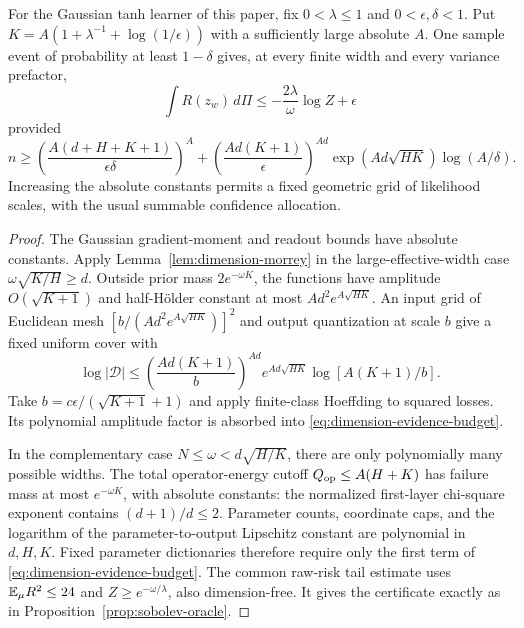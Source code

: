 \begin{proposition}
\label{prop:dimension-evidence}
For the Gaussian tanh learner of this paper, fix
$0<\lambda\le1$ and $0<\epsilon,\delta<1$. Put
$K=A(1+\lambda^{-1}+\log(1/\epsilon))$ with a sufficiently large
absolute $A$. One sample event of probability at least $1-\delta$
gives, at every finite width and every variance prefactor,
\[
 \int R(z_w)\,d\Pi\le-\frac{2\lambda}{\omega}\log Z+\epsilon
\]
provided
\begin{equation}
 n\ge\left(\frac{A(d+H+K+1)}{\epsilon\delta}\right)^A
  +\left(\frac{Ad(K+1)}\epsilon\right)^{Ad}
        \exp(A d\sqrt{HK})\log(A/\delta).
 \label{eq:dimension-evidence-budget}
\end{equation}
Increasing the absolute constants permits a fixed geometric grid of
likelihood scales, with the usual summable confidence allocation.
\end{proposition}
\begin{proof}
The Gaussian gradient-moment and readout bounds have absolute constants.
Apply Lemma~\ref{lem:dimension-morrey} in the large-effective-width
case $\omega\sqrt{K/H}\ge d$. Outside prior mass
$2e^{-\omega K}$, the functions have amplitude $O(\sqrt{K+1})$
and half-H\"older constant at most $Ad^2e^{A\sqrt{HK}}$.
An input grid of Euclidean mesh
$[b/(Ad^2e^{A\sqrt{HK}})]^2$ and output quantization at scale $b$
give a fixed uniform cover with
\[
 \log|\mathcal D|\le
       \left(\frac{Ad(K+1)}b\right)^{Ad}
           e^{Ad\sqrt{HK}}\log[A(K+1)/b].
\]
Take $b=c\epsilon/(\sqrt{K+1}+1)$ and apply finite-class Hoeffding
to squared losses. Its polynomial amplitude factor is absorbed into
\eqref{eq:dimension-evidence-budget}.

In the complementary case $N\le\omega<d\sqrt{H/K}$, there are only
polynomially many possible widths. The total operator-energy cutoff
$Q_{\rm op}\le A(H+K)$ has failure mass at most $e^{-\omega K}$,
with absolute constants: the normalized first-layer chi-square
exponent contains $(d+1)/d\le2$. Parameter counts, coordinate caps,
and the logarithm of the parameter-to-output Lipschitz constant are
polynomial in $d,H,K$. Fixed parameter dictionaries therefore require
only the first term of \eqref{eq:dimension-evidence-budget}.
The common raw-risk tail estimate uses $\mathbb E_\mu R^2\le24$ and
$Z\ge e^{-\omega/\lambda}$, also dimension-free. It gives the
certificate exactly as in Proposition~\ref{prop:sobolev-oracle}.
\end{proof}
